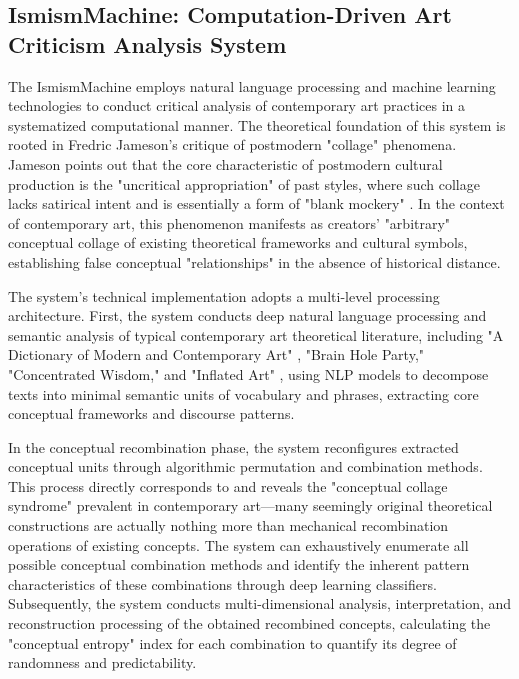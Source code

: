\documentclass{article}
\begin{document}
\subsection{IsmismMachine: Computation-Driven Art Criticism Analysis System}

The IsmismMachine employs natural language processing and machine learning technologies to conduct critical analysis of contemporary art practices in a systematized computational manner. The theoretical foundation of this system is rooted in Fredric Jameson's critique of postmodern "collage" phenomena. Jameson points out that the core characteristic of postmodern cultural production is the "uncritical appropriation" of past styles, where such collage lacks satirical intent and is essentially a form of "blank mockery" \cite{jameson1991postmodernism}. In the context of contemporary art, this phenomenon manifests as creators' "arbitrary" conceptual collage of existing theoretical frameworks and cultural symbols, establishing false conceptual "relationships" in the absence of historical distance.

The system's technical implementation adopts a multi-level processing architecture. First, the system conducts deep natural language processing and semantic analysis of typical contemporary art theoretical literature, including "A Dictionary of Modern and Contemporary Art" \cite{chilvers_glaves_smith2009_dictionary}, "Brain Hole Party," "Concentrated Wisdom," and "Inflated Art" \cite{jiandan2025_pengzhang_yishu}, using NLP models to decompose texts into minimal semantic units of vocabulary and phrases, extracting core conceptual frameworks and discourse patterns.

In the conceptual recombination phase, the system reconfigures extracted conceptual units through algorithmic permutation and combination methods. This process directly corresponds to and reveals the "conceptual collage syndrome" prevalent in contemporary art—many seemingly original theoretical constructions are actually nothing more than mechanical recombination operations of existing concepts. The system can exhaustively enumerate all possible conceptual combination methods and identify the inherent pattern characteristics of these combinations through deep learning classifiers. Subsequently, the system conducts multi-dimensional analysis, interpretation, and reconstruction processing of the obtained recombined concepts, calculating the "conceptual entropy" index for each combination to quantify its degree of randomness and predictability.
\end{document}
